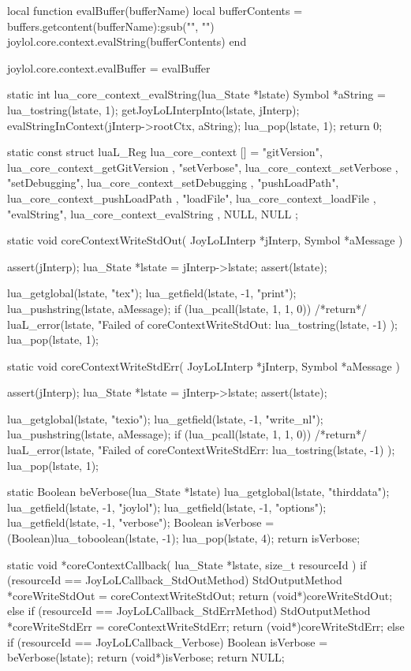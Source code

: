 \startLuaCode
local function evalBuffer(bufferName) 
  local bufferContents =
    buffers.getcontent(bufferName):gsub("", "\n")
  joylol.core.context.evalString(bufferContents)
end

joylol.core.context.evalBuffer = evalBuffer
\stopLuaCode

\startCCode
static int lua_core_context_evalString(lua_State *lstate) {
  Symbol *aString = lua_tostring(lstate, 1);
  getJoyLoLInterpInto(lstate, jInterp);
  evalStringInContext(jInterp->rootCtx, aString);
  lua_pop(lstate, 1);
  return 0;
}
\stopCCode

\startCCode
static const struct luaL_Reg lua_core_context [] = {
  { "gitVersion",   lua_core_context_getGitVersion },
  { "setVerbose",   lua_core_context_setVerbose    },
  { "setDebugging", lua_core_context_setDebugging  },
  { "pushLoadPath", lua_core_context_pushLoadPath  },
  { "loadFile",     lua_core_context_loadFile      },
  { "evalString",   lua_core_context_evalString    },
  {NULL, NULL}
};
\stopCCode

\startCCode
static void coreContextWriteStdOut(
  JoyLoLInterp *jInterp,
  Symbol       *aMessage
) {
  assert(jInterp);
  lua_State *lstate = jInterp->lstate;
  assert(lstate);
  
  lua_getglobal(lstate, "tex");
  lua_getfield(lstate, -1, "print");
  lua_pushstring(lstate, aMessage);
  if (lua_pcall(lstate, 1, 1, 0)) {
    /*return*/ luaL_error(lstate,
      "Failed of coreContextWriteStdOut\nERROR:\n%
      lua_tostring(lstate, -1)
    );
  }
  lua_pop(lstate, 1);
}

static void coreContextWriteStdErr(
  JoyLoLInterp *jInterp,
  Symbol       *aMessage
) {
  assert(jInterp);
  lua_State *lstate = jInterp->lstate;
  assert(lstate);
  
  lua_getglobal(lstate, "texio");
  lua_getfield(lstate, -1, "write_nl");
  lua_pushstring(lstate, aMessage);
  if (lua_pcall(lstate, 1, 1, 0)) {
    /*return*/ luaL_error(lstate,
      "Failed of coreContextWriteStdErr\nERROR:\n%
      lua_tostring(lstate, -1)
    );
  }
  lua_pop(lstate, 1);
}

static Boolean beVerbose(lua_State *lstate) {
  lua_getglobal(lstate, "thirddata");
  lua_getfield(lstate, -1, "joylol");
  lua_getfield(lstate, -1, "options");
  lua_getfield(lstate, -1, "verbose");
  Boolean isVerbose = (Boolean)lua_toboolean(lstate, -1);
  lua_pop(lstate, 4);
  return isVerbose;
}

static void *coreContextCallback(
  lua_State *lstate,
  size_t resourceId
) {
  if (resourceId == JoyLoLCallback_StdOutMethod) {
    StdOutputMethod *coreWriteStdOut =
      coreContextWriteStdOut;
    return (void*)coreWriteStdOut;
  } else if (resourceId == JoyLoLCallback_StdErrMethod) {
    StdOutputMethod *coreWriteStdErr =
      coreContextWriteStdErr;
    return (void*)coreWriteStdErr;
  } else if (resourceId == JoyLoLCallback_Verbose) {
    Boolean isVerbose = beVerbose(lstate);
    return (void*)isVerbose;
  }
  return NULL;
}
\stopCCode

